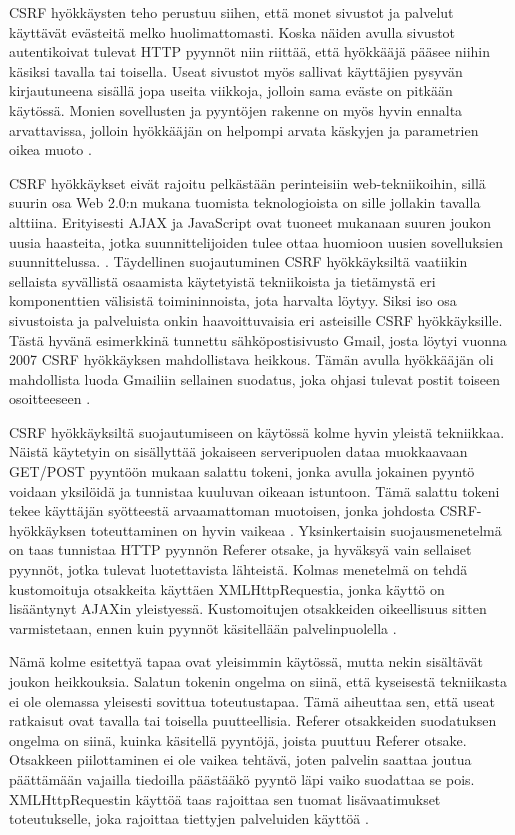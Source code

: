 CSRF hyökkäysten teho perustuu siihen, että monet sivustot ja palvelut käyttävät evästeitä melko huolimattomasti. Koska näiden avulla sivustot autentikoivat tulevat 
HTTP pyynnöt niin riittää, että hyökkääjä pääsee niihin käsiksi tavalla tai toisella. Useat sivustot myös sallivat käyttäjien pysyvän kirjautuneena sisällä
jopa useita viikkoja, jolloin sama eväste on pitkään käytössä. Monien sovellusten ja pyyntöjen rakenne on myös hyvin ennalta arvattavissa, jolloin hyökkääjän
on helpompi arvata käskyjen ja parametrien oikea muoto \cite{WEB2}.

CSRF hyökkäykset eivät rajoitu pelkästään perinteisiin web-tekniikoihin, sillä suurin osa Web 2.0:n mukana tuomista teknologioista on sille jollakin 
tavalla alttiina. Erityisesti AJAX ja JavaScript ovat tuoneet mukanaan suuren joukon uusia haasteita, jotka suunnittelijoiden tulee ottaa huomioon uusien
sovelluksien suunnittelussa. \cite{WEB2b}. Täydellinen suojautuminen CSRF hyökkäyksiltä vaatiikin sellaista syvällistä osaamista käytetyistä tekniikoista ja 
tietämystä eri komponenttien välisistä toimininnoista, jota harvalta löytyy. Siksi iso osa sivustoista ja palveluista onkin haavoittuvaisia eri asteisille
CSRF hyökkäyksille. Tästä hyvänä esimerkkinä tunnettu sähköpostisivusto Gmail, josta löytyi vuonna 2007 CSRF hyökkäyksen mahdollistava heikkous. Tämän avulla
hyökkääjän oli mahdollista luoda Gmailiin sellainen suodatus, joka ohjasi tulevat postit toiseen osoitteeseen \cite{CSRF}. 

CSRF hyökkäyksiltä suojautumiseen on käytössä kolme hyvin yleistä tekniikkaa. Näistä käytetyin on sisällyttää jokaiseen serveripuolen dataa muokkaavaan
GET/POST pyyntöön mukaan salattu tokeni, jonka avulla jokainen pyyntö voidaan yksilöidä ja tunnistaa kuuluvan oikeaan istuntoon. Tämä salattu tokeni tekee
käyttäjän syötteestä arvaamattoman muotoisen, jonka johdosta CSRF-hyökkäyksen toteuttaminen on hyvin vaikeaa \cite{WEB2}. Yksinkertaisin suojausmenetelmä on 
taas tunnistaa HTTP pyynnön Referer otsake, ja hyväksyä vain sellaiset pyynnöt, jotka tulevat luotettavista lähteistä. Kolmas menetelmä on tehdä kustomoituja
otsakkeita käyttäen XMLHttpRequestia, jonka käyttö on lisääntynyt AJAXin yleistyessä. Kustomoitujen otsakkeiden oikeellisuus sitten varmistetaan, ennen kuin
pyynnöt käsitellään palvelinpuolella \cite{CSRF}.

Nämä kolme esitettyä tapaa ovat yleisimmin käytössä, mutta nekin sisältävät joukon heikkouksia. Salatun tokenin ongelma on siinä, että kyseisestä tekniikasta ei 
ole olemassa yleisesti sovittua toteutustapaa. Tämä aiheuttaa sen, että useat ratkaisut ovat tavalla tai toisella puutteellisia. Referer otsakkeiden suodatuksen 
ongelma on siinä, kuinka käsitellä pyyntöjä, joista puuttuu Referer otsake. Otsakkeen piilottaminen ei ole vaikea tehtävä, joten palvelin saattaa joutua 
päättämään vajailla tiedoilla päästääkö pyyntö läpi vaiko suodattaa se pois. XMLHttpRequestin käyttöä taas rajoittaa sen tuomat lisävaatimukset toteutukselle,
joka rajoittaa tiettyjen palveluiden käyttöä \cite{CSRF}. 

